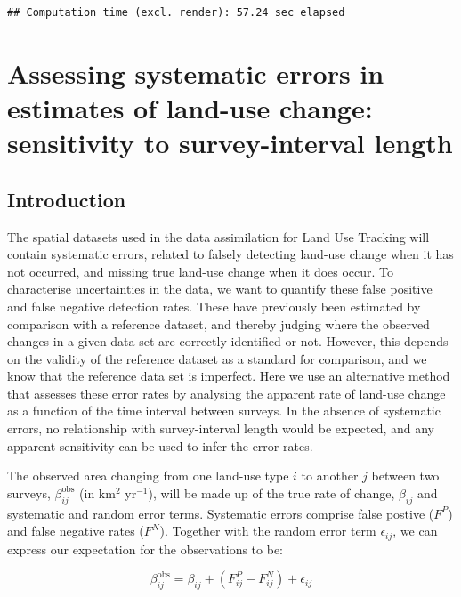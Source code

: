 \documentclass[
]{book}
\begin{document}
\begin{verbatim}
## Computation time (excl. render): 57.24 sec elapsed
\end{verbatim}

\hypertarget{assessing-systematic-errors-in-estimates-of-land-use-change-sensitivity-to-survey-interval-length}{%
\chapter{Assessing systematic errors in estimates of land-use change: sensitivity to survey-interval length}\label{assessing-systematic-errors-in-estimates-of-land-use-change-sensitivity-to-survey-interval-length}}

\hypertarget{introduction-3}{%
\section{Introduction}\label{introduction-3}}

The spatial datasets used in the data assimilation for Land Use Tracking will contain systematic errors, related to falsely detecting land-use change when it has not occurred, and missing true land-use change when it does occur.
To characterise uncertainties in the data, we want to quantify these false positive and false negative detection rates.
These have previously been estimated by comparison with a reference dataset, and thereby judging where the observed changes in a given data set are correctly identified or not. However, this depends on the validity of the reference dataset as a standard for comparison, and we know that the reference data set is imperfect. Here we use an alternative method that assesses these error rates by analysing the apparent rate of land-use change as a function of the time interval between surveys. In the absence of systematic errors, no relationship with survey-interval length would be expected, and any apparent sensitivity can be used to infer the error rates.

The observed area changing from one land-use type \(i\) to another \(j\) between two surveys, \(\beta_{ij}^{\mathrm{obs}}\) (in km\(^2\) yr\(^{-1}\)), will be made up of the true rate of change, \(\beta_{ij}\) and systematic and random error terms. Systematic errors comprise false postive (\(F^P\)) and false negative rates (\(F^N\)). Together with the random error term \(\epsilon_{ij}\), we can express our expectation for the observations to be:

\begin{equation} \label{eq:beta_errors}
\beta_{ij}^{\mathrm{obs}} = \beta_{ij} + (F_{ij}^P - F_{ij}^N) + \epsilon_{ij}
\end{equation}
\end{document}
